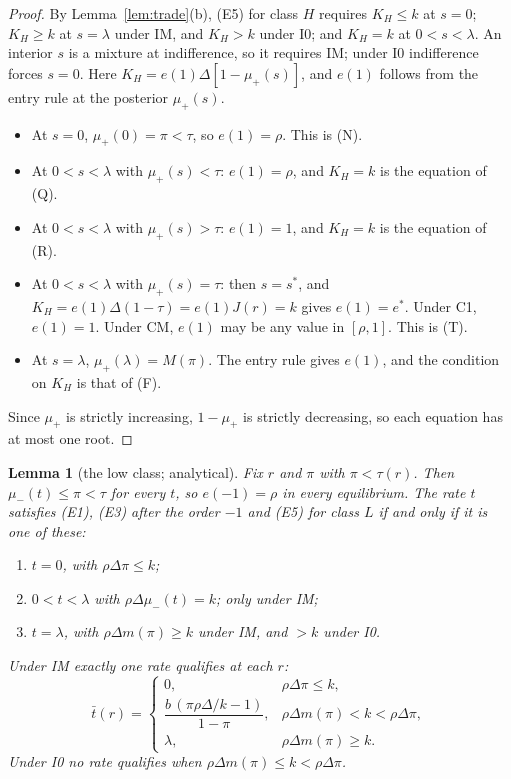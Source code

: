 \documentclass[11pt]{article}
\newtheorem{lemma}{Lemma}
\theoremstyle{definition}
\begin{document}
\begin{proof}
By Lemma~\ref{lem:trade}(b), (E5) for class $H$ requires $K_H\le k$ at $s=0$; $K_H\ge k$ at $s=\lambda$ under IM,
and $K_H>k$ under I0; and $K_H=k$ at $0<s<\lambda$. An interior $s$ is a mixture at indifference, so it requires
IM; under I0 indifference forces $s=0$. Here $K_H=e(1)\Delta[1-\mu_+(s)]$, and $e(1)$ follows from
the entry rule at the posterior $\mu_+(s)$.
\begin{itemize}
\item At $s=0$, $\mu_+(0)=\pi<\tau$, so $e(1)=\rho$. This is (N).
\item At $0<s<\lambda$ with $\mu_+(s)<\tau$: $e(1)=\rho$, and $K_H=k$ is the equation of (Q).
\item At $0<s<\lambda$ with $\mu_+(s)>\tau$: $e(1)=1$, and $K_H=k$ is the equation of (R).
\item At $0<s<\lambda$ with $\mu_+(s)=\tau$: then $s=s^*$, and $K_H=e(1)\Delta(1-\tau)=e(1)J(r)=k$ gives
  $e(1)=e^*$. Under C1, $e(1)=1$. Under CM, $e(1)$ may be any value in $[\rho,1]$. This is (T).
\item At $s=\lambda$, $\mu_+(\lambda)=M(\pi)$. The entry rule gives $e(1)$, and the condition on
  $K_H$ is that of (F).
\end{itemize}
Since $\mu_+$ is strictly increasing, $1-\mu_+$ is strictly decreasing, so each equation has at most one root.
\end{proof}

\begin{lemma}[the low class; analytical]\label{lem:L}
Fix $r$ and $\pi$ with $\pi<\tau(r)$. Then $\mu_-(t)\le\pi<\tau$ for every $t$, so $e(-1)=\rho$ in every
equilibrium. The rate $t$ satisfies (E1), (E3) after the order $-1$ and (E5) for class $L$ if and only if it is
one of these:
\begin{enumerate}
\item[(N)] $t=0$, with $\rho\Delta\pi\le k$;
\item[(Q)] $0<t<\lambda$ with $\rho\Delta\mu_-(t)=k$; only under IM;
\item[(F)] $t=\lambda$, with $\rho\Delta m(\pi)\ge k$ under IM, and $>k$ under I0.
\end{enumerate}
Under IM exactly one rate qualifies at each $r$:
\[
\bar t(r)=\begin{cases}0, & \rho\Delta\pi\le k,\\[2pt]
\dfrac{b\,(\pi\rho\Delta/k-1)}{1-\pi}, & \rho\Delta m(\pi)<k<\rho\Delta\pi,\\[6pt]
\lambda, & \rho\Delta m(\pi)\ge k.\end{cases}
\]
Under I0 no rate qualifies when $\rho\Delta m(\pi)\le k<\rho\Delta\pi$.
\end{lemma}
\end{document}

